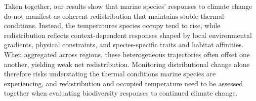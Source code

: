 \documentclass[9pt,twocolumn,twoside]{pnas-new}
\begin{document}
Taken together, our results show that marine species' responses to climate change do not manifest as coherent redistribution that maintains stable thermal conditions. Instead, the temperatures species occupy tend to rise, while redistribution reflects context-dependent responses shaped by local environmental gradients, physical constraints, and species-specific traits and habitat affinities. When aggregated across regions, these heterogeneous trajectories often offset one another, yielding weak net redistribution. Monitoring distributional change alone therefore risks understating the thermal conditions marine species are experiencing, and redistribution and occupied temperature need to be assessed together when evaluating biodiversity responses to continued climate change.
%
\end{document}
